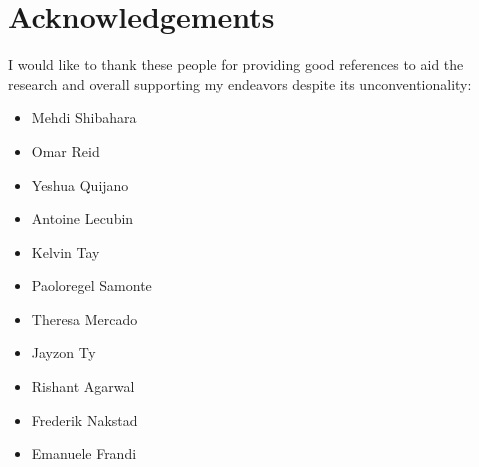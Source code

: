 \documentclass[10pt,twocolumn,letterpaper]{article}
\begin{document}








\section*{Acknowledgements}
I would like to thank these people for providing good references to aid the research and overall supporting my endeavors despite its unconventionality:\\

\begin{itemize}
	\item Mehdi Shibahara
    \item Omar Reid
    \item Yeshua Quijano
    \item Antoine Lecubin
	\item Kelvin Tay
	\item Paoloregel Samonte
	\item Theresa Mercado
	\item Jayzon Ty
	\item Rishant Agarwal
	\item Frederik Nakstad
	\item Emanuele Frandi
\end{itemize}

{\small


}
\end{document}
